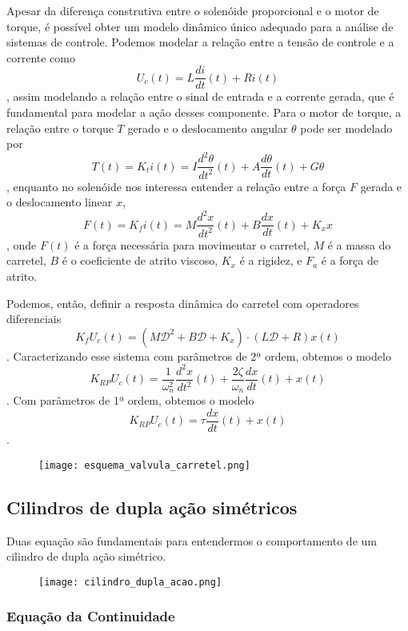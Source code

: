 \documentclass[a4paper]{report}
\begin{document}
Apesar da diferença construtiva entre o solenóide proporcional e o motor de torque, é possível obter um modelo dinâmico único adequado para a análise de sistemas de controle. Podemos modelar a relação entre a tensão de controle e a corrente como \[
U_c(t) = L \frac{di}{dt}(t) + R i(t)
\], assim modelando a relação entre o sinal de entrada e a corrente gerada, que é fundamental para modelar a ação desses componente. Para o motor de torque, a relação entre o torque $T$ gerado e o deslocamento angular $\theta$ pode ser modelado por \[
T(t) = K_t i(t) = I \frac{d^2\theta}{dt^2}(t) + A \frac{d\theta}{dt}(t) +G\theta
\], enquanto no solenóide nos interessa entender a relação entre a força $F$ gerada e o deslocamento linear $x$, \[
F(t) = K_f i(t) = M \frac{d^2x}{dt^2}(t) + B \frac{dx}{dt}(t) +K_x x
\], onde $F(t)$ é a força necessária para movimentar o carretel, $M$ é a massa do carretel, $B$ é o coeficiente de atrito viscoso, $K_x$ é a rigidez, e $F_a$ é a força de atrito.

Podemos, então, definir a resposta dinâmica do carretel com operadores diferenciais \[
K_f U_c(t) = \left( M \mathcal{D}^2 + B \mathcal{D} + K_x \right) \cdot \left( L\mathcal{D} + R \right) x(t)
\]. Caracterizando esse sistema com parâmetros de 2ª ordem, obtemos o modelo \[
K_{RP}U_c(t) = \frac{1}{\omega_n^2}\frac{d^2x}{dt^2}(t) + \frac{2\zeta}{\omega_n}\frac{dx}{dt}(t) + x(t)
\]. Com parâmetros de 1ª ordem, obtemos o modelo \[
K_{RP}U_c(t) = \tau \frac{dx}{dt}(t) + x(t)
\].

\begin{figure}[H]
    \centering
    \texttt{[image: esquema\_valvula\_carretel.png]}
\end{figure}

\subsection*{Cilindros de dupla ação simétricos}

Duas equação são fundamentais para entendermos o comportamento de um cilindro de dupla ação simétrico.

\begin{figure}[H]
    \centering
    \texttt{[image: cilindro\_dupla\_acao.png]}
\end{figure}

\subsubsection*{Equação da Continuidade}
\end{document}
